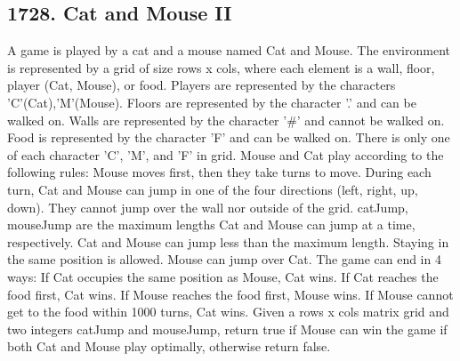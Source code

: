 \documentclass[9pt, b5paper]{article}
\begin{document}
\subsection{1728. Cat and Mouse II}
\label{sec-4-9}
A game is played by a cat and a mouse named Cat and Mouse.
The environment is represented by a grid of size rows x cols, where each element is a wall, floor, player (Cat, Mouse), or food.
Players are represented by the characters 'C'(Cat),'M'(Mouse).
Floors are represented by the character '.' and can be walked on.
Walls are represented by the character '\#' and cannot be walked on.
Food is represented by the character 'F' and can be walked on.
There is only one of each character 'C', 'M', and 'F' in grid.
Mouse and Cat play according to the following rules:
Mouse moves first, then they take turns to move.
During each turn, Cat and Mouse can jump in one of the four directions (left, right, up, down). They cannot jump over the wall nor outside of the grid.
catJump, mouseJump are the maximum lengths Cat and Mouse can jump at a time, respectively. Cat and Mouse can jump less than the maximum length.
Staying in the same position is allowed.
Mouse can jump over Cat.
The game can end in 4 ways:
If Cat occupies the same position as Mouse, Cat wins.
If Cat reaches the food first, Cat wins.
If Mouse reaches the food first, Mouse wins.
If Mouse cannot get to the food within 1000 turns, Cat wins.
Given a rows x cols matrix grid and two integers catJump and mouseJump, return true if Mouse can win the game if both Cat and Mouse play optimally, otherwise return false.
\end{document}
